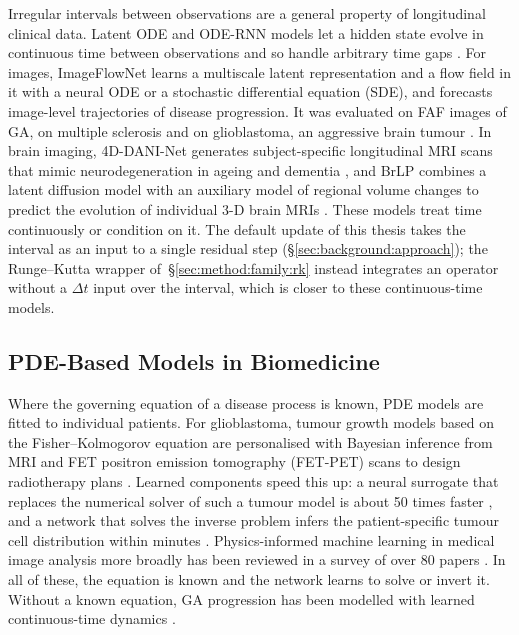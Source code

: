 Irregular intervals between observations are a general property of
longitudinal clinical data. Latent ODE and ODE-RNN models let a hidden
state evolve in continuous time between observations and so handle
arbitrary time gaps \citep{Rubanova2019}. For images, ImageFlowNet learns
a multiscale latent representation and a flow field in it with a neural
ODE or a stochastic differential equation (SDE), and forecasts image-level trajectories of disease
progression. It was evaluated on FAF images of GA, on multiple sclerosis
and on glioblastoma, an aggressive brain tumour
\citep{Liu2025ImageFlowNet}. In brain imaging,
4D-DANI-Net generates subject-specific longitudinal MRI scans that mimic
neurodegeneration in ageing and dementia \citep{Ravi2022}, and BrLP
combines a latent diffusion model with an auxiliary model of regional
volume changes to predict the evolution of individual 3-D brain MRIs
\citep{Puglisi2024}. These models treat time continuously or condition
on it. The default update of this thesis takes the interval as an input
to a single residual step (\S\ref{sec:background:approach}); the
Runge--Kutta wrapper of~\S\ref{sec:method:family:rk} instead integrates
an operator without a $\Delta t$ input over the interval, which is closer
to these continuous-time models.

\subsection{PDE-Based Models in Biomedicine}
\label{sec:background:related-work:pde}

Where the governing equation of a disease process is known, PDE models
are fitted to individual patients. For glioblastoma, tumour growth
models based on the Fisher--Kolmogorov equation are personalised with
Bayesian inference from MRI and FET positron emission tomography
(FET-PET) scans to design radiotherapy
plans \citep{Lipkova2019}. Learned components speed this up: a neural
surrogate that replaces the numerical solver of such a tumour model is
about 50 times faster \citep{Ezhov2022}, and a network that solves the
inverse problem infers the patient-specific tumour cell distribution
within minutes \citep{Ezhov2023}. Physics-informed machine learning in
medical image analysis more broadly has been reviewed in a survey of
over 80 papers \citep{Banerjee2025}. In all of these, the equation is
known and the network learns to solve or invert it. Without a known
equation, GA progression has been modelled with learned continuous-time
dynamics \citep{Lachinov2024, Liu2025ImageFlowNet}.

